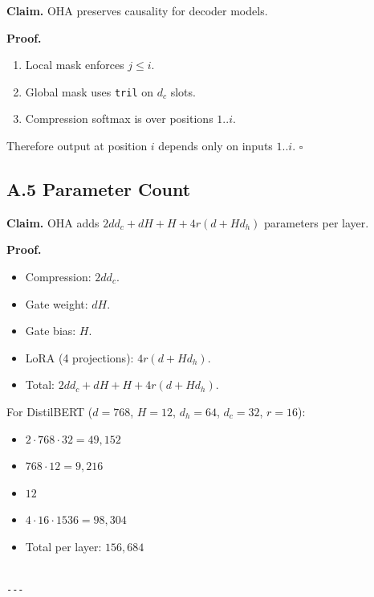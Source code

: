 \textbf{Claim.} OHA preserves causality for decoder models.

\textbf{Proof.} 
\begin{enumerate}
\item Local mask enforces $j \leq i$.
\item Global mask uses \texttt{tril} on $d_c$ slots.
\item Compression softmax is over positions $1..i$.

\end{enumerate}
Therefore output at position $i$ depends only on inputs $1..i$. $\square$

\subsection{A.5 Parameter Count}

\textbf{Claim.} OHA adds $2 d d_c + d H + H + 4 r(d + H d_h)$ parameters per layer.

\textbf{Proof.}
\begin{itemize}
\item Compression: $2 d d_c$.
\item Gate weight: $d H$.
\item Gate bias: $H$.
\item LoRA (4 projections): $4 r(d + H d_h)$.
\item Total: $2 d d_c + d H + H + 4 r(d + H d_h)$.

\end{itemize}
For DistilBERT ($d = 768$, $H = 12$, $d_h = 64$, $d_c = 32$, $r = 16$):
\begin{itemize}
\item $2 \cdot 768 \cdot 32 = 49,152$
\item $768 \cdot 12 = 9,216$
\item $12$
\item $4 \cdot 16 \cdot 1536 = 98,304$
\item Total per layer: $156,684$
\end{itemize}
\begin{lstlisting}

---
\end{lstlisting}